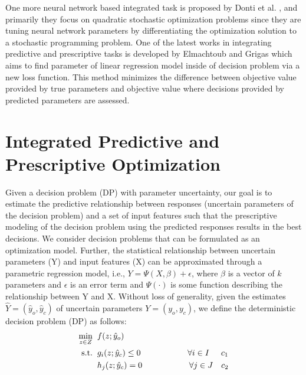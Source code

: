 \documentclass[12pt]{article}
\begin{document}
One more neural network based integrated task is proposed by Donti et al. \cite{NIPS2017_7132}, and primarily they focus on quadratic stochastic optimization problems since they are tuning neural network parameters by differentiating the optimization solution to a stochastic programming problem.
One of the latest works in integrating predictive and prescriptive tasks is developed by Elmachtoub and Grigas  \cite{Elmachtoub2017SmartT} which aims to find parameter of linear regression model inside of decision problem via a new loss function. This method minimizes the difference between objective value provided by true parameters and objective value where decisions provided by predicted parameters are assessed.

\section{Integrated Predictive and Prescriptive Optimization}
Given a decision problem (DP) with parameter uncertainty, our goal is to estimate the predictive relationship between responses (uncertain parameters of the decision problem) and a set of input features such that the prescriptive modeling of the decision problem using the predicted responses results in the best decisions. We consider decision problems that can be formulated as an optimization model. Further, the statistical relationship between uncertain parameters (Y) and input features (X) can be approximated through a parametric regression model, i.e., $Y=\Psi(X,\beta)+\epsilon$, where $\beta$ is a vector of $k$ parameters and $\epsilon$ is an error term and $\Psi(\cdot)$ is some function describing the relationship between Y and X. Without loss of generality, given the estimates $\hat{Y}=(\hat{y}_o,\hat{y}_c)$ of uncertain parameters $Y=(y_o,y_c)$, we define the deterministic decision problem (DP) as follows:
\begin{subequations}
\begin{flalign}
\min\limits_{{z \in Z}} \hspace{2 mm} & f(z;\hat{y}_o) \label{eq:eq1-4}\\
\textrm{s.t.} \hspace{2 mm} & g_i(z;\hat{y}_c)\leq 0 \hspace{20 mm} \forall i \in I \hspace{5 mm} c_1\\
& h_j(z;\hat{y}_c)= 0 \hspace{20 mm} \forall j \in J \hspace{3.5 mm} c_2
\end{flalign}
\end{subequations}
\end{document}
